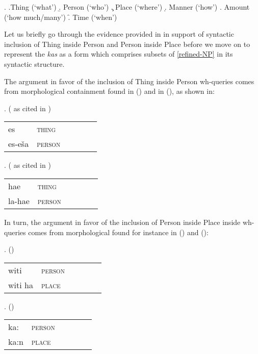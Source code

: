 \ex. 
\a.Thing (`what')
\b. Person (`who')
\c. Place (`where')
\d. Manner (`how')
\e. Amount (`how much/many') 
\f. Time (`when')
 
\noindent 
Let us briefly go through the evidence provided in \cite{BaunazLanderTUM} in support of syntactic inclusion of Thing inside Person and Person inside Place  before we move on to represent the  \textit{kas} as a form which comprises subsets of \ref{refined-NP} in its syntactic structure. 
\par
The argument in favor of the inclusion of Thing inside Person wh-queries comes from morphological containment found in  () and in  (), as shown in:

\ex.  (\citealt[573]{Wise1986} as cited in \citealt{Cysouw2004})\\[0.25ex]
\begin{tabular}[t]{ l l l l l l }
es & \textsc{thing}\\
es-e\v{s}a  & \textsc{person}\\
\end{tabular}

\ex.  (\citealt[\S8.6.2]{VanDenBerg1989} as cited in \citealt{BaunazLanderTUM})\\[0.25ex]
\begin{tabular}[t]{ l l l l l l }
hae & \textsc{thing}\\
la-hae  & \textsc{person}\\
\end{tabular}

In turn, the argument in favor of the inclusion of Person inside Place inside wh-queries comes from morphological  found for instance in  () and  ():

\ex.  (\citealt[67, 70]{Borgman1990})\\[0.25ex]
\begin{tabular}[t]{ l l l l l l }
witi & \textsc{person}\\
witi ha  & \textsc{place}\\
\end{tabular}

\ex.  (\citealt[114]{Campbell1985})\\[0.25ex]
\begin{tabular}[t]{ l l l l l l }
ka: & \textsc{person}\\
ka:n  & \textsc{place}\\
\end{tabular}

